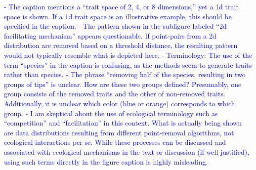 \documentclass[
]{article}
\begin{document}
\textcolor{blue}{- The caption mentions a ``trait space of 2, 4, or 8 dimensions,'' yet a 1d trait space is shown.
If a 1d trait space is an illustrative example, this should be specified in the caption.}
\textcolor{blue}{- The pattern shown in the subfigure labeled ``2d facilitating mechanism'' appears questionable.
If point-pairs from a 2d distribution are removed based on a threshold distance, the resulting pattern would not typically resemble what is depicted here.}
\textcolor{blue}{- Terminology: The use of the term ``species'' in the caption is confusing, as the methods seem to generate traits rather than species.}
\textcolor{blue}{- The phrase ``removing half of the species, resulting in two groups of tips'' is unclear.
How are these two groups defined? Presumably, one group consists of the removed traits and the other of non-removed traits.
Additionally, it is unclear which color (blue or orange) corresponds to which group.}
\textcolor{blue}{- I am skeptical about the use of ecological terminology such as ``competition'' and ``facilitation'' in this context.
What is actually being shown are data distributions resulting from different point-removal algorithms, not ecological interactions per se.
While these processes can be discussed and associated with ecological mechanisms in the text or discussion (if well justified), using such terms directly in the figure caption is highly misleading.}
\end{document}
